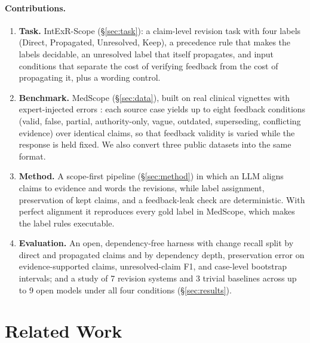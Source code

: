 \documentclass[11pt]{article}
\newcommand{\D}{\textsc{D}}
\newcommand{\Pp}{\textsc{P}}
\newcommand{\K}{\textsc{K}}
\newcommand{\U}{\textsc{U}}
\newcommand{\ms}{MedScope}
\begin{document}
\paragraph{Contributions.}
\begin{enumerate}\itemsep0pt
  \item \textbf{Task.} IntExR-Scope (\S\ref{sec:task}): a claim-level revision task with four labels (\D{}irect, \Pp{}ropagated, \U{}nresolved, \K{}eep), a precedence rule that makes the labels decidable, an unresolved label that itself propagates, and input conditions that separate the cost of verifying feedback from the cost of propagating it, plus a wording control.
  \item \textbf{Benchmark.} \ms{} (\S\ref{sec:data}), built on real clinical vignettes with expert-injected errors \citep{benabacha2025medec}: each source case yields up to eight feedback conditions (valid, false, partial, authority-only, vague, outdated, superseding, conflicting evidence) over identical claims, so that feedback validity is varied while the response is held fixed. We also convert three public datasets into the same format.
  \item \textbf{Method.} A scope-first pipeline (\S\ref{sec:method}) in which an LLM aligns claims to evidence and words the revisions, while label assignment, preservation of kept claims, and a feedback-leak check are deterministic. With perfect alignment it reproduces every gold label in \ms{}, which makes the label rules executable.
  \item \textbf{Evaluation.} An open, dependency-free harness with change recall split by direct and propagated claims and by dependency depth, preservation error on evidence-supported claims, unresolved-claim F1, and case-level bootstrap intervals; and a study of 7 revision systems and 3 trivial baselines across up to 9 open models under all four conditions (\S\ref{sec:results}).
\end{enumerate}

\section{Related Work}
\label{sec:related}
\end{document}
